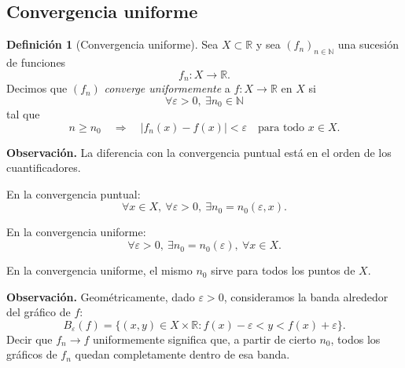 \documentclass[11pt,a4paper,openany]{book}
\theoremstyle{definition}
\newtheorem{definicion}{Definición}[chapter]
\theoremstyle{plain}
\theoremstyle{remark}
\newenvironment{observacion}
{\par\medskip\noindent\textbf{Observación. }\normalfont}
{\par\medskip}
\newcommand{\R}{\mathbb{R}}
\newcommand{\N}{\mathbb{N}}
\begin{document}
\subsection{Convergencia uniforme}

\begin{grisplano}
\begin{definicion}[Convergencia uniforme]
Sea $X\subset\R$ y sea $(f_n)_{n\in\N}$ una sucesión de funciones
\[
    f_n:X\to\R.
\]
Decimos que $(f_n)$ \emph{converge uniformemente} a $f:X\to\R$ en $X$ si
\[
    \forall \varepsilon>0,\ \exists n_0\in\N
\]
tal que
\[
    n\geq n_0
    \quad\Longrightarrow\quad
    |f_n(x)-f(x)|<\varepsilon
    \quad\text{para todo }x\in X.
\]
\end{definicion}
\end{grisplano}

\begin{observacion}
La diferencia con la convergencia puntual está en el orden de los cuantificadores.

En la convergencia puntual:
\[
    \forall x\in X,\ \forall\varepsilon>0,\ \exists n_0=n_0(\varepsilon,x).
\]

En la convergencia uniforme:
\[
    \forall\varepsilon>0,\ \exists n_0=n_0(\varepsilon),\ \forall x\in X.
\]

En la convergencia uniforme, el mismo $n_0$ sirve para todos los puntos de $X$.
\end{observacion}

\begin{observacion}
Geométricamente, dado $\varepsilon>0$, consideramos la banda alrededor del
gráfico de $f$:
\[
    B_\varepsilon(f)
    =
    \{(x,y)\in X\times\R:
    f(x)-\varepsilon<y<f(x)+\varepsilon\}.
\]
Decir que $f_n\to f$ uniformemente significa que, a partir de cierto $n_0$,
todos los gráficos de $f_n$ quedan completamente dentro de esa banda.
\end{observacion}
\end{document}
